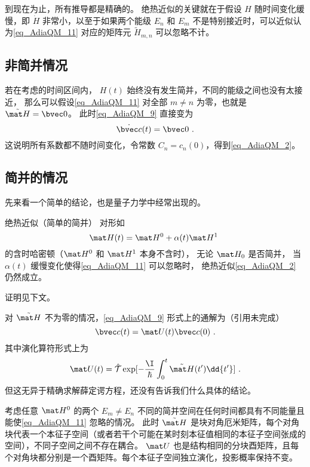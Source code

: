 到现在为止，所有推导都是精确的。 绝热近似的关键就在于假设 $H$ 随时间变化缓慢，即 $\dot H$ 非常小，以至于如果两个能级 $E_n$ 和 $E_m$ 不是特别接近时，可以近似认为\autoref{eq_AdiaQM_11} 对应的矩阵元 $\tilde H_{m,n}$ 可以忽略不计。

\subsection{非简并情况}
若在考虑的时间区间内， $H(t)$ 始终没有发生简并，不同的能级之间也没有太接近， 那么可以假设\autoref{eq_AdiaQM_11} 对全部 $m\ne n$ 为零，也就是 $\tilde{\mat H} = \bvec 0$。 此时\autoref{eq_AdiaQM_9} 直接变为
\begin{equation}
\dot{\bvec c}(t) = \bvec 0~.
\end{equation}
这说明所有系数都不随时间变化，令常数 $C_n = c_n(0)$，得到\autoref{eq_AdiaQM_2}。

\subsection{简并的情况}\label{sub_AdiaQM_1}
先来看一个简单的结论，也是量子力学中经常出现的。
\begin{theorem}{绝热近似（简单的简并）}\label{the_AdiaQM_2}
对形如
\begin{equation}\label{eq_AdiaQM_15}
\mat H(t) = \mat H^0 + \alpha(t)\mat H^1~
\end{equation}
的含时哈密顿（$\mat H^0$ 和 $\mat H^1$ 本身不含时）， 无论 $\mat H_0$ 是否简并， 当 $\alpha(t)$ 缓慢变化使得\autoref{eq_AdiaQM_11} 可以忽略时， 绝热近似\autoref{eq_AdiaQM_2} 仍然成立。
\end{theorem}
证明见下文。

对 $\tilde{\mat H}$ 不为零的情况，\autoref{eq_AdiaQM_9} 形式上的通解为（引用未完成）
\begin{equation}
\bvec c(t) = \mat U(t)\bvec c(0)~.
\end{equation}
其中演化算符形式上为
\begin{equation}
\mat U(t) = \hat{\mathcal{T}}\exp[-\frac{\I}{\hbar}\int_0^t \tilde{\mat H}(t') \dd{t'}]~.
\end{equation}
但这无异于精确求解薛定谔方程，还没有告诉我们什么具体的结论。

考虑任意 $\mat H^0$ 的两个 $E_m\ne E_n$ 不同的简并空间在任何时间都具有不同能量且能使\autoref{eq_AdiaQM_11} 忽略的情况。 此时 $\tilde{\mat H}$ 是块对角厄米矩阵，每个对角块代表一个本征子空间（或者若干个可能在某时刻本征值相同的本征子空间张成的空间），不同子空间之间不存在耦合。 $\mat U$ 也是结构相同的分块酉矩阵，且每个对角块都分别是一个酉矩阵。每个本征子空间独立演化，投影概率保持不变。

